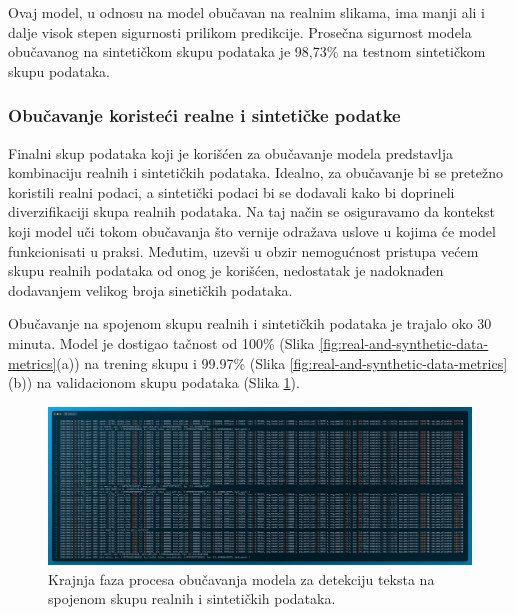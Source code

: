 \documentclass[a4paper,12pt]{article}
\begin{document}
	Ovaj model, u odnosu na model obučavan na realnim slikama, ima manji ali i dalje visok stepen sigurnosti prilikom predikcije. Prosečna sigurnost modela obučavanog na sintetičkom skupu podataka je 98,73\% na testnom sintetičkom skupu podataka.
	
	\subsubsection{Obučavanje koristeći realne i sintetičke podatke}
	Finalni skup podataka koji je korišćen za obučavanje modela predstavlja kombinaciju realnih i sintetičkih podataka. Idealno, za obučavanje bi se pretežno koristili realni podaci, a sintetički podaci bi se dodavali kako bi doprineli diverzifikaciji skupa realnih podataka. Na taj način se osiguravamo da kontekst koji model uči tokom obučavanja što vernije odražava uslove u kojima će model funkcionisati u praksi. Međutim, uzevši u obzir nemogućnost pristupa većem skupu realnih podataka od onog je korišćen, nedostatak je nadoknađen dodavanjem velikog broja sinetičkih podataka.
	
	Obučavanje na spojenom skupu realnih i sintetičkih podataka je trajalo oko 30 minuta. Model je dostigao tačnost od 100\% (Slika \ref{fig:real-and-synthetic-data-metrics}(a)) na trening skupu i 99.97\% (Slika \ref{fig:real-and-synthetic-data-metrics}(b)) na validacionom skupu podataka (Slika \ref{fig:train-code-real-and-synthetic-data}).
	
	\begin{figure}[H]
		\centering
		\includegraphics[width=\textwidth]{assets/train-code-real-and-synthetic-data.png}
		\caption{Krajnja faza procesa obučavanja modela za detekciju teksta na spojenom skupu realnih i sintetičkih podataka.}
		\label{fig:train-code-real-and-synthetic-data}
	\end{figure}
	
\end{document}
